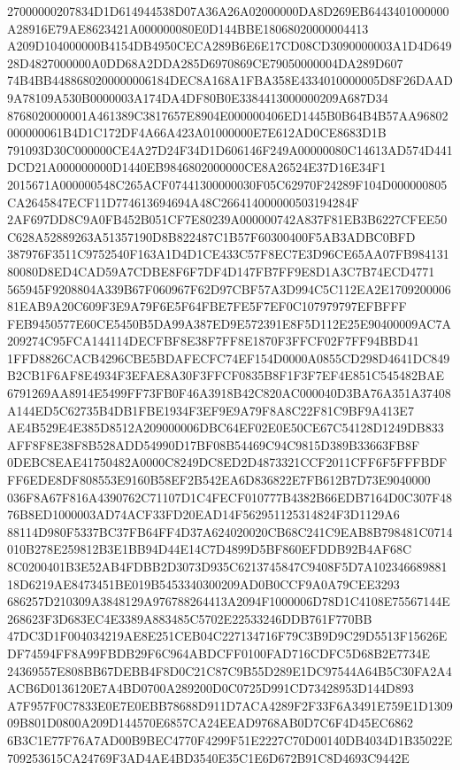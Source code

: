 \documentclass[UTF8,fontset=fandol,zihao=-4,a4paper]{ctexart}
\begin{document}
{{27000000207834D1D614944538D07A36A26A02000000DA8D269EB6443401000000A28916E79AE8623421A000000080E0D144BBE18068020000004413
A209D104000000B4154DB4950CECA289B6E6E17CD08CD3090000003A1D4D64928D4827000000A0DD68A2DDA285D6970869CE79050000004DA289D607
74B4BB4488680200000006184DEC8A168A1FBA358E4334010000005D8F26DAAD9A78109A530B0000003A174DA4DF80B0E3384413000000209A687D34
8768020000001A461389C3817657E8904E000000406ED1445B0B64B4B57AA96802000000061B4D1C172DF4A66A423A01000000E7E612AD0CE8683D1B
791093D30C000000CE4A27D24F34D1D606146F249A00000080C14613AD574D441DCD21A000000000D1440EB9846802000000CE8A26524E37D16E34F1
2015671A000000548C265ACF07441300000030F05C62970F24289F104D000000805CA2645847ECF11D774613694694A48C266414000000503194284F
2AF697DD8C9A0FB452B051CF7E80239A000000742A837F81EB3B6227CFEE50C628A52889263A51357190D8B822487C1B57F60300400F5AB3ADBC0BFD
387976F3511C9752540F163A1D4D1CE433C57F8EC7E3D96CE65AA07FB98413180080D8ED4CAD59A7CDBE8F6F7DF4D147FB7FF9E8D1A3C7B74ECD4771
565945F9208804A339B67F060967F62D97CBF57A3D994C5C112EA2E170920000681EAB9A20C609F3E9A79F6E5F64FBE7FE5F7EF0C107979797EFBFFF
FEB9450577E60CE5450B5DA99A387ED9E572391E8F5D112E25E90400009AC7A209274C95FCA144114DECFBF8E38F7FF8E1870F3FFCF02F7FF94BBD41
1FFD8826CACB4296CBE5BDAFECFC74EF154D0000A0855CD298D4641DC849B2CB1F6AF8E4934F3EFAE8A30F3FFCF0835B8F1F3F7EF4E851C545482BAE
6791269AA8914E5499FF73FB0F46A3918B42C820AC000040D3BA76A351A37408A144ED5C62735B4DB1FBE1934F3EF9E9A79F8A8C22F81C9BF9A413E7
AE4B529E4E385D8512A209000006DBC64EF02E0E50CE67C54128D1249DB833AFF8F8E38F8B528ADD54990D17BF08B54469C94C9815D389B33663FB8F
0DEBC8EAE41750482A0000C8249DC8ED2D4873321CCF2011CFF6F5FFFBDFFF6EDE8DF808553E9160B58EF2B542EA6D836822E7FB612B7D73E9040000
036F8A67F816A4390762C71107D1C4FECF010777B4382B66EDB7164D0C307F4876B8ED1000003AD74ACF33FD20EAD14F562951125314824F3D1129A6
88114D980F5337BC37FB64FF4D37A624020020CB68C241C9EAB8B798481C0714010B278E259812B3E1BB94D44E14C7D4899D5BF860EFDDB92B4AF68C
8C0200401B3E52AB4FDBB2D3073D935C6213745847C9408F5D7A10234668988118D6219AE8473451BE019B5453340300209AD0B0CCF9A0A79CEE3293
686257D210309A3848129A976788264413A2094F1000006D78D1C4108E75567144E268623F3D683EC4E3389A883485C5702E22533246DDB761F770BB
47DC3D1F004034219AE8E251CEB04C227134716F79C3B9D9C29D5513F15626EDF74594FF8A99FBDB29F6C964ABDCFF0100FAD716CDFC5D68B2E7734E
24369557E808BB67DEBB4F8D0C21C87C9B55D289E1DC97544A64B5C30FA2A4ACB6D0136120E7A4BD0700A289200D0C0725D991CD73428953D144D893
A7F957F0C7833E0E7E0EBB78688D911D7ACA4289F2F33F6A3491E759E1D130909B801D0800A209D144570E6857CA24EEAD9768AB0D7C6F4D45EC6862
6B3C1E77F76A7AD00B9BEC4770F4299F51E2227C70D00140DB4034D1B35022E709253615CA24769F3AD4AE4BD3540E35C1E6D672B91C8D4693C9442E
}}
\end{document}
